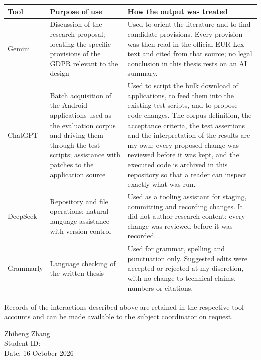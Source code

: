 \begin{table}[H]
\centering
\small
\setlength{\tabcolsep}{4pt}
\begin{tabular}{>{\raggedright\arraybackslash}p{}>{\raggedright\arraybackslash}p{}>{\raggedright\arraybackslash}p{}}
\toprule
Tool & Purpose of use & How the output was treated \\
\midrule
Gemini & Discussion of the research proposal; locating the specific provisions of the GDPR relevant to the design & Used to orient the literature and to find candidate provisions. Every provision was then read in the official EUR-Lex text and cited from that source; no legal conclusion in this thesis rests on an AI summary. \\
ChatGPT & Batch acquisition of the Android applications used as the evaluation corpus and driving them through the test scripts; assistance with patches to the application source & Used to script the bulk download of applications, to feed them into the existing test scripts, and to propose code changes. The corpus definition, the acceptance criteria, the test assertions and the interpretation of the results are my own; every proposed change was reviewed before it was kept, and the executed code is archived in this repository so that a reader can inspect exactly what was run. \\
DeepSeek & Repository and file operations; natural-language assistance with version control & Used as a tooling assistant for staging, committing and recording changes. It did not author research content; every change was reviewed before it was recorded. \\
Grammarly & Language checking of the written thesis & Used for grammar, spelling and punctuation only. Suggested edits were accepted or rejected at my discretion, with no change to technical claims, numbers or citations. \\
\bottomrule
\end{tabular}
\end{table}

Records of the interactions described above are retained in the respective tool
accounts and can be made available to the subject coordinator on request.

\vspace{1em}
\noindent Zhiheng Zhang \\
\ifsubmissionedition Student ID: \PrivacyLensStudentID \\ \fi
Date: 16 October 2026
